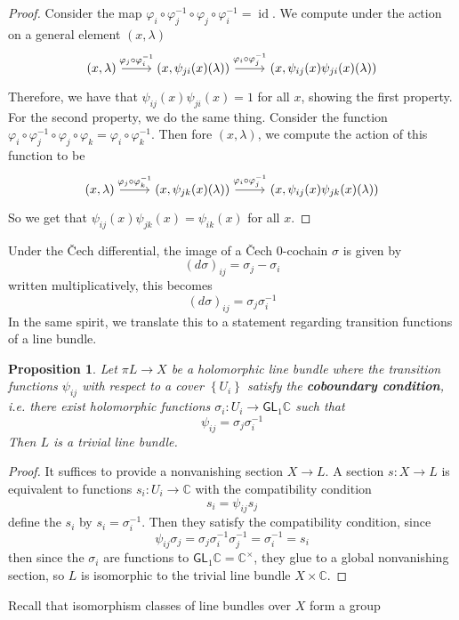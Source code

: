 \documentclass[psamsfonts, 12pt]{amsart}
\newtheorem{prop}[thm]{Proposition}
\theoremstyle{definition}
\theoremstyle{remark}
\newcommand{\ib}[1]{\textbf{\textit{#1}}}
\newcommand{\C}{\mathbb{C}}
\newcommand{\GL}{\mathsf{GL}}
\newcommand{\inv}{^{-1}}
\newcommand{\set}[1]{\left\lbrace #1 \right\rbrace}
\DeclareMathOperator{\id}{id}
\begin{document}
\begin{proof}
Consider the map $\varphi_i\circ\varphi_j\inv\circ\varphi_j\circ\varphi_i\inv = \id$.
We compute under the action on a general element $(x,\lambda)$
\[\begin{tikzcd}
(x,\lambda) \ar[r, "\varphi_j\circ\varphi_i\inv"] & (x,\psi_{ji}(x)(\lambda))
\ar[r, "\varphi_i\circ\varphi_j\inv"] & (x,\psi_{ij}(x)\psi_{ji}(x)(\lambda))
\end{tikzcd}\]
Therefore, we have that $\psi_{ij}(x)\psi_{ji}(x) = 1$ for all $x$, showing the
first property. For the second property, we do the same thing. Consider
the function
$\varphi_i\circ\varphi_j\inv\circ\varphi_j\circ\varphi_k = \varphi_i\circ\varphi_k\inv$.
Then fore $(x,\lambda)$, we compute the action of this function to be
\[\begin{tikzcd}
(x,\lambda) \ar[r, "\varphi_j\circ\varphi_k\inv"] & (x,\psi_{jk}(x)(\lambda))
\ar[r, "\varphi_i\circ\varphi_j\inv"] & (x,\psi_{ij}(x)\psi_{jk}(x)(\lambda))
\end{tikzcd}\]
So we get that $\psi_{ij}(x)\psi_{jk}(x) = \psi_{ik}(x)$ for all $x$.
\end{proof}
%
Under the \v{C}ech differential, the image of a \v{C}ech $0$-cochain $\sigma$ is given
by
\[
(d\sigma)_{ij} = \sigma_j - \sigma_i
\]
written multiplicatively, this becomes
\[
(d\sigma)_{ij} = \sigma_j\sigma_i\inv
\]
In the same spirit, we translate this to a statement regarding transition functions
of a line bundle.
%
\begin{prop}
Let $\pi L \to X$ be a holomorphic line bundle where the transition functions
$\psi_{ij}$ with respect to a cover $\set{U_i}$ satisfy the \ib{coboundary condition},
i.e. there exist holomorphic functions $\sigma_i : U_i \to \GL_1\C$ such that
\[
\psi_{ij} = \sigma_j\sigma_i\inv
\]
Then $L$ is a trivial line bundle.
\end{prop}
%
\begin{proof}
It suffices to provide a nonvanishing section $X \to L$. A section $s : X \to L$ is
equivalent to functions $s_i : U_i \to \C$ with the compatibility condition
\[
s_i = \psi_{ij}s_j
\]
define the $s_i$ by $s_i = \sigma_i\inv$. Then they satisfy the compatibility condition,
since
\[
\psi_{ij}\sigma_j = \sigma_j\sigma_i\inv\sigma_j\inv = \sigma_i\inv = s_i
\]
then since the $\sigma_i$ are functions to $\GL_1\C = \C^\times$, they glue to
a global nonvanishing section, so $L$ is isomorphic to the trivial line bundle
$X \times \C$.
\end{proof}
%
Recall that isomorphism classes of line bundles over $X$ form a group
\end{document}
